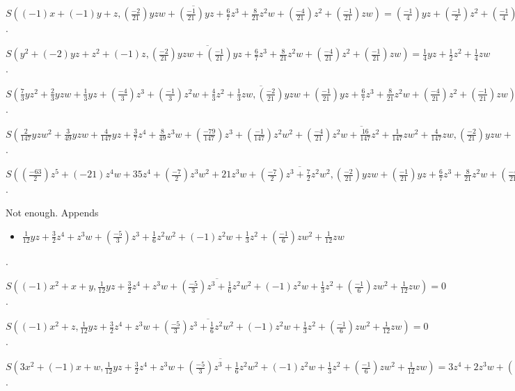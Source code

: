 \documentclass{jsarticle}
\begin{document}
$\overline{S((-1)x+(-1)y+z, (\frac{-2}{21})yzw+(\frac{-1}{21})yz+\frac{6}{7}z^{3}+\frac{8}{21}z^{2}w+(\frac{-4}{21})z^{2}+(\frac{-1}{21})zw)} = (\frac{-1}{4})yz+(\frac{-1}{2})z^{2}+(\frac{-1}{4})zw$.  

$\overline{S(y^{2}+(-2)yz+z^{2}+(-1)z, (\frac{-2}{21})yzw+(\frac{-1}{21})yz+\frac{6}{7}z^{3}+\frac{8}{21}z^{2}w+(\frac{-4}{21})z^{2}+(\frac{-1}{21})zw)} = \frac{1}{4}yz+\frac{1}{2}z^{2}+\frac{1}{4}zw$.  

$\overline{S(\frac{7}{3}yz^{2}+\frac{2}{3}yzw+\frac{1}{3}yz+(\frac{-4}{3})z^{3}+(\frac{-1}{3})z^{2}w+\frac{4}{3}z^{2}+\frac{1}{3}zw, (\frac{-2}{21})yzw+(\frac{-1}{21})yz+\frac{6}{7}z^{3}+\frac{8}{21}z^{2}w+(\frac{-4}{21})z^{2}+(\frac{-1}{21})zw)} = 0$.  

$\overline{S(\frac{2}{147}yzw^{2}+\frac{3}{49}yzw+\frac{4}{147}yz+\frac{3}{7}z^{4}+\frac{8}{49}z^{3}w+(\frac{-79}{147})z^{3}+(\frac{-1}{147})z^{2}w^{2}+(\frac{-4}{21})z^{2}w+\frac{16}{147}z^{2}+\frac{1}{147}zw^{2}+\frac{4}{147}zw, (\frac{-2}{21})yzw+(\frac{-1}{21})yz+\frac{6}{7}z^{3}+\frac{8}{21}z^{2}w+(\frac{-4}{21})z^{2}+(\frac{-1}{21})zw)} = \frac{63}{2}z^{4}+21z^{3}w+(\frac{-7}{2})z^{3}+\frac{7}{2}z^{2}w^{2}$.  

$\overline{S((\frac{-63}{2})z^{5}+(-21)z^{4}w+35z^{4}+(\frac{-7}{2})z^{3}w^{2}+21z^{3}w+(\frac{-7}{2})z^{3}+\frac{7}{2}z^{2}w^{2}, (\frac{-2}{21})yzw+(\frac{-1}{21})yz+\frac{6}{7}z^{3}+\frac{8}{21}z^{2}w+(\frac{-4}{21})z^{2}+(\frac{-1}{21})zw)} = 0$.  

Not enough.  Appends \begin{itemize}
\item $\frac{1}{12}yz+\frac{3}{2}z^{4}+z^{3}w+(\frac{-5}{3})z^{3}+\frac{1}{6}z^{2}w^{2}+(-1)z^{2}w+\frac{1}{3}z^{2}+(\frac{-1}{6})zw^{2}+\frac{1}{12}zw$
\end{itemize}  . 


$\overline{S((-1)x^{2}+x+y, \frac{1}{12}yz+\frac{3}{2}z^{4}+z^{3}w+(\frac{-5}{3})z^{3}+\frac{1}{6}z^{2}w^{2}+(-1)z^{2}w+\frac{1}{3}z^{2}+(\frac{-1}{6})zw^{2}+\frac{1}{12}zw)} = 0$.  

$\overline{S((-1)x^{2}+z, \frac{1}{12}yz+\frac{3}{2}z^{4}+z^{3}w+(\frac{-5}{3})z^{3}+\frac{1}{6}z^{2}w^{2}+(-1)z^{2}w+\frac{1}{3}z^{2}+(\frac{-1}{6})zw^{2}+\frac{1}{12}zw)} = 0$.  

$\overline{S(3x^{2}+(-1)x+w, \frac{1}{12}yz+\frac{3}{2}z^{4}+z^{3}w+(\frac{-5}{3})z^{3}+\frac{1}{6}z^{2}w^{2}+(-1)z^{2}w+\frac{1}{3}z^{2}+(\frac{-1}{6})zw^{2}+\frac{1}{12}zw)} = 3z^{4}+2z^{3}w+(\frac{-10}{3})z^{3}+\frac{1}{3}z^{2}w^{2}+(-2)z^{2}w+\frac{1}{3}z^{2}+(\frac{-1}{3})zw^{2}$.  
\end{document}
